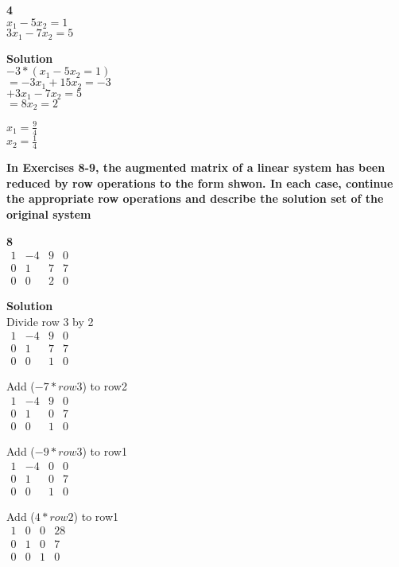 \documentclass{article}
\begin{document}
\textbf{4}\\
$x_{1} - 5x_{2} = 1$\\
$3x_{1} - 7x_{2} = 5$

\textbf{Solution}\\
$-3*(x_{1} - 5x_{2} = 1)$\\
$=-3x_{1}+15x_{2} = -3$\\
$+ 3x_{1} - 7x_{2} = 5$\\
$= 8x_{2} = 2$

$x_{1} = \frac{9}{4}$\\
$x_{2} = \frac{1}{4}$

\textbf{In Exercises 8-9, the augmented matrix of a linear system has been reduced by row operations to the form shwon. In each case, continue the appropriate row operations and describe the solution set of the original system}

\textbf{8}\\
$
\begin{matrix}
1 & -4 & 9 & 0\\
0 & 1 & 7 &  7\\
0 & 0 & 2 &  0
\end{matrix}
$

\textbf{Solution}\\
Divide row 3 by 2\\
$
\begin{matrix}
1 & -4 & 9 & 0\\
0 & 1 & 7 &  7\\
0 & 0 & 1 &  0
\end{matrix}
$

Add ($-7*row3$) to row2\\
$
\begin{matrix}
1 & -4 & 9 & 0\\
0 & 1 & 0 &  7\\
0 & 0 & 1 &  0
\end{matrix}
$

Add ($-9*row3$) to row1\\
$
\begin{matrix}
1 & -4 & 0 & 0\\
0 & 1 & 0 &  7\\
0 & 0 & 1 &  0
\end{matrix}
$

Add ($4*row2$) to row1\\
$
\begin{matrix}
1 & 0 & 0 & 28\\
0 & 1 & 0 &  7\\
0 & 0 & 1 &  0
\end{matrix}
$
\end{document}
